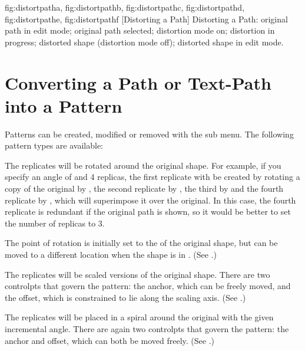{
  {fig:distortpatha}{}{},
  {fig:distortpathb}{}{},
  {fig:distortpathc}{}{},
  {fig:distortpathd}{}{},
  {fig:distortpathe}{}{},
  {fig:distortpathf}{}{}
}
[Distorting a Path]
{Distorting a Path: 
 original path in edit mode;
 original path selected;
 distortion mode on;
 distortion in progress;
 distorted shape (distortion mode off);
 distorted shape in edit mode.}

\section{Converting a Path or Text-Path into a Pattern}\label{sec:patterns}

Patterns can be created, modified or removed with the
 sub menu. The following pattern types
are available:
\begin{deflist}

\begin{itemdesc}
The replicates will be rotated around the original
shape. For example, if you specify an angle of  and 4
replicas, the first replicate with be created by rotating a copy of
the original by , the second replicate by ,
the third by  and the fourth replicate by
, which will superimpose it over the original.
In this case, the fourth replicate is redundant if the original path
is shown, so it would be better to set the number of replicas to 3.

The point of rotation is initially set to the  of the original
shape, but can be moved to a different location when the shape is in
\editpathmode. (See .)

\end{itemdesc}


\begin{itemdesc}
The replicates will be scaled versions of the original
shape. There are two \glspl{controlpt} that govern the pattern: the
anchor, which can be freely moved, and the offset, which is
constrained to lie along the scaling axis. (See
.)
\end{itemdesc}


\begin{itemdesc}
The replicates will be placed in a spiral around the
original with the given incremental angle. There are again two
\glspl{controlpt} that govern the pattern: the anchor and offset,
which can both be moved freely. (See .)
\end{itemdesc}

\end{deflist}


